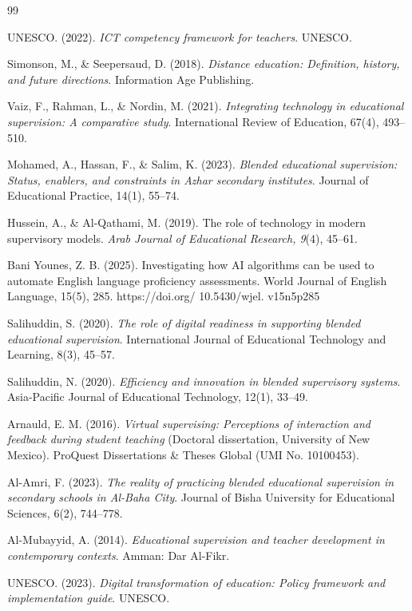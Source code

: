 \documentclass[10pt]{NSP1}
\begin{document}
\begin{thebibliography}{99}

 UNESCO. (2022). \emph{ICT competency framework for teachers}. UNESCO.

 Simonson, M., \& Seepersaud, D. (2018). \emph{Distance education: Definition, history, and future directions}. Information Age Publishing.

 Vaiz, F., Rahman, L., \& Nordin, M. (2021). \emph{Integrating technology in educational supervision: A comparative study}. International Review of Education, 67(4), 493--510.

 Mohamed, A., Hassan, F., \& Salim, K. (2023). \emph{Blended educational supervision: Status, enablers, and constraints in Azhar secondary institutes}. Journal of Educational Practice, 14(1), 55--74.

 Hussein, A., \& Al-Qathami, M. (2019). The role of technology in modern supervisory models. \emph{Arab Journal of Educational Research, 9}(4), 45--61.

 Bani Younes, Z. B. (2025). Investigating how AI algorithms can be used to automate English language proficiency assessments. World Journal of English Language, 15(5), 285. https://doi.org/ 10.5430/wjel. v15n5p285

 Salihuddin, S. (2020). \emph{The role of digital readiness in supporting blended educational supervision}. International Journal of Educational Technology and Learning, 8(3), 45--57.

 Salihuddin, N. (2020). \emph{Efficiency and innovation in blended supervisory systems}. Asia-Pacific Journal of Educational Technology, 12(1), 33--49.

 Arnauld, E. M. (2016). \emph{Virtual supervising: Perceptions of interaction and feedback during student teaching} (Doctoral dissertation, University of New Mexico). ProQuest Dissertations \& Theses Global (UMI No. 10100453).

 Al-Amri, F. (2023). \emph{The reality of practicing blended educational supervision in secondary schools in Al-Baha City}. Journal of Bisha University for Educational Sciences, 6(2), 744--778.

 Al-Mubayyid, A. (2014). \emph{Educational supervision and teacher development in contemporary contexts}. Amman: Dar Al-Fikr.

 UNESCO. (2023). \emph{Digital transformation of education: Policy framework and implementation guide}. UNESCO.


\end{thebibliography}
\end{document}
